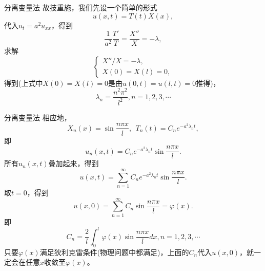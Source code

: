 \documentclass[11pt]{beamer}
\begin{document}
\begin{frame}{分离变量法}
故技重施，我们先设一个简单的形式
\begin{equation}
u(x,t) = T(t) X(x),
\end{equation}
代入$u_t = a^2 u_{xx}$，得到
\begin{equation}
\frac{1}{a^2} \frac{T'}{T} = \frac{X''}{X} = - \lambda,
\end{equation}
求解
\begin{equation}
\left\{
\begin{aligned}
X''/X = - \lambda, \\
X(0) = X(l) = 0,
\end{aligned}
\right.
\end{equation}
得到(上式中$X(0)=X(l)=0$是由$u(0,t)=u(l,t)=0$推得)，
\begin{equation}
\lambda_n = \frac{n^2 \pi^2}{l^2}, n=1,2,3,\cdots
\end{equation}
\end{frame}

\begin{frame}{分离变量法}
相应地，
\begin{equation}
X_n(x) = \sin \frac{n\pi x}{l}, ~~ T_n (t) = C_n e^{-a^2 \lambda_n t},
\end{equation}
即
\begin{equation}
u_n(x,t) = C_n e^{-a^2 \lambda_n t} \sin \frac{n\pi x}{l}.
\end{equation}
所有$u_n(x,t)$叠加起来，得到
\begin{equation}
u(x,t) = \sum^\infty_{n=1} C_n e^{-a^2 \lambda_n t} \sin \frac{n\pi x}{l}.
\end{equation}
取$t=0$，得到
\begin{equation}
u(x,0) = \sum^\infty_{n=1} C_n \sin \frac{n\pi x}{l} = \varphi(x).
\end{equation}
即
\begin{equation}
C_n = \frac{2}{l} \int^l_0 \varphi(x) \sin \frac{n\pi x}{l} dx, n=1,2,3,\cdots
\end{equation}
{\tiny 只要$\varphi(x)$满足狄利克雷条件(物理问题中都满足)，上面的$C_n$代入$u(x,0)$，就一定会在任意$x$收敛至$\varphi(x)$。}
\end{frame}
\end{document}
